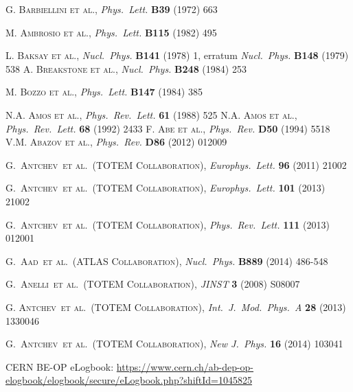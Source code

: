\documentclass[3p,onecolumn,12pt,times,longtitle]{elsarticle}
\def\etal{et al.}
\def\Name#1{\textsc{#1}, }
\def\REVIEW#1#2#3#4{{\it #1} {\bf #2} (#3) #4}
\begin{document}
\begin{thebibliography}{99}
%
 \Name{G. Barbiellini et al.} \REVIEW{Phys.~Lett.}{B39}{1972}{663}

 \Name{M. Ambrosio et al.} \REVIEW{Phys.~Lett.}{B115}{1982}{495}

 \Name{L. Baksay et al.} \REVIEW{Nucl.~Phys.}{B141}{1978}{1}, 
erratum \REVIEW{Nucl.~Phys.}{B148}{1979}{538}
 \Name{A. Breakstone et al.} \REVIEW{Nucl.~Phys.}{B248}{1984}{253}

 \Name{M. Bozzo et al.} \REVIEW{Phys.~Lett.}{B147}{1984}{385}

 \Name{N.A. Amos et al.} \REVIEW{Phys.~Rev.~Lett.}{61}{1988}{525}
 \Name{N.A. Amos et al.} \REVIEW{Phys.~Rev.~Lett.}{68}{1992}{2433}
 \Name{F. Abe et al.} \REVIEW{Phys.~Rev.}{D50}{1994}{5518}
 \Name{V.M. Abazov et al.} \REVIEW{Phys.~Rev.}{D86}{2012}{012009}

	\Name{G.~Antchev~\etal{}~(TOTEM Collaboration)}
	\REVIEW{Europhys.~Lett.}{96}{2011}{21002}

	\Name{G.~Antchev~\etal{}~(TOTEM Collaboration)}
	\REVIEW{Europhys.~Lett.}{101}{2013}{21002}

	\Name{G.~Antchev~\etal{}~(TOTEM Collaboration)}
	\REVIEW{Phys.~Rev.~Lett.}{111}{2013}{012001}

	\Name{G.~Aad~\etal{}~(ATLAS Collaboration)}
	\REVIEW{Nucl.~Phys.}{B889}{2014}{486-548}

	\Name{G.~Anelli~\etal{}~(TOTEM Collaboration)}
	\REVIEW{JINST}{3}{2008}{S08007}


	\Name{G. Antchev~\etal{}~(TOTEM Collaboration)}
	\REVIEW{Int.~J.~Mod.~Phys.~A}{28}{2013}{1330046}

	\Name{G.~Antchev~\etal{}~(TOTEM Collaboration)}
	\REVIEW{New J.~Phys.}{16}{2014}{103041}

 CERN BE-OP eLogbook: \url{https://www.cern.ch/ab-dep-op-elogbook/elogbook/secure/eLogbook.php?shiftId=1045825}


\end{thebibliography}
\end{document}
